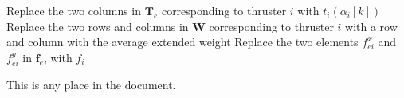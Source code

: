 \documentclass[11pt]{article}
\begin{document}
\begin{algorithm}[ht]
\begin{algorithmic}[1]
            \Else {}
            \State Replace the two columns in $\mathbf T_e$ corresponding to thruster $i$ with $t_i(\alpha_i[k])$
            \State Replace the two rows and columns in $\mathbf W$ corresponding to thruster $i$ with
            \Statex \quad \quad \quad \quad \quad \quad \quad \quad a row and column with the average extended weight
            \State Replace the two elements $f_{ei}^x$ and $f_{ei}^y$ in $\mathbf f_e$, with $f_i$
            \EndIf
            \EndFor
        \EndProcedure
        \Statex
    \end{algorithmic}
\end{algorithm}


This is \hypertarget{anyplace}{any place in the document}.
\end{document}
